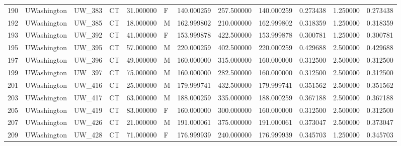 \begin{tabular}{llllrlrrrrrr}
190    &     UWashington &       UW\_383 &                 CT &  31.000000 &        F &       140.000259 &    257.500000 &  140.000259 &               0.273438 &            1.250000 &          0.273438 \\
192    &     UWashington &       UW\_385 &                 CT &  18.000000 &        M &       162.999802 &    210.000000 &  162.999802 &               0.318359 &            1.250000 &          0.318359 \\
193    &     UWashington &       UW\_392 &                 CT &  41.000000 &        F &       153.999878 &    422.500000 &  153.999878 &               0.300781 &            1.250000 &          0.300781 \\
195    &     UWashington &       UW\_395 &                 CT &  57.000000 &        M &       220.000259 &    402.500000 &  220.000259 &               0.429688 &            2.500000 &          0.429688 \\
197    &     UWashington &       UW\_396 &                 CT &  49.000000 &        M &       160.000000 &    315.000000 &  160.000000 &               0.312500 &            2.500000 &          0.312500 \\
199    &     UWashington &       UW\_397 &                 CT &  75.000000 &        M &       160.000000 &    282.500000 &  160.000000 &               0.312500 &            2.500000 &          0.312500 \\
201    &     UWashington &       UW\_416 &                 CT &  25.000000 &        M &       179.999741 &    432.500000 &  179.999741 &               0.351562 &            2.500000 &          0.351562 \\
203    &     UWashington &       UW\_417 &                 CT &  63.000000 &        M &       188.000259 &    335.000000 &  188.000259 &               0.367188 &            2.500000 &          0.367188 \\
205    &     UWashington &       UW\_419 &                 CT &  83.000000 &        F &       160.000000 &    300.000000 &  160.000000 &               0.312500 &            2.500000 &          0.312500 \\
207    &     UWashington &       UW\_426 &                 CT &  21.000000 &        M &       191.000061 &    375.000000 &  191.000061 &               0.373047 &            2.500000 &          0.373047 \\
209    &     UWashington &       UW\_428 &                 CT &  71.000000 &        F &       176.999939 &    240.000000 &  176.999939 &               0.345703 &            1.250000 &          0.345703 \\

\end{tabular}
